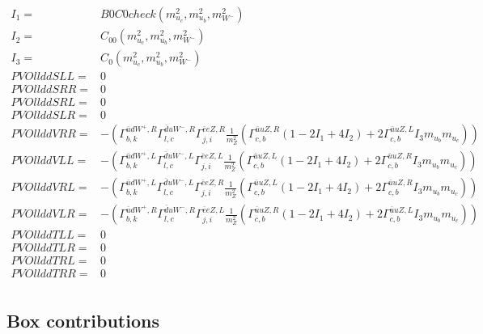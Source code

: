 \documentclass[A4,landscape]{article}
\begin{document}
\begin{align} 
I_1= & B0C0check(m^2_{u_{{c}}}, m^2_{u_{{b}}}, m^2_{W^-}) \\ 
I_2= & C_{00}(m^2_{u_{{c}}}, m^2_{u_{{b}}}, m^2_{W^-}) \\ 
I_3= & C_0(m^2_{u_{{c}}}, m^2_{u_{{b}}}, m^2_{W^-}) \\ 
  PVOllddSLL= & 0 \\ 
  PVOllddSRR= & 0 \\ 
  PVOllddSRL= & 0 \\ 
  PVOllddSLR= & 0 \\ 
  PVOllddVRR= & -( \Gamma^{\bar{u}d W^+,R}_{b, k} \Gamma^{\bar{d}u W^- ,R}_{l, c} \Gamma^{\bar{e}e Z ,R}_{j, i} \frac{1}{m^2_{Z}} (\Gamma^{\bar{u}u Z ,R}_{c, b} (1 - 2 I_1 + 4 I_2) + 2 \Gamma^{\bar{u}u Z ,L}_{c, b} I_3 m_{u_{{b}}} m_{u_{{c}}})) \\ 
  PVOllddVLL= & -( \Gamma^{\bar{u}d W^+,L}_{b, k} \Gamma^{\bar{d}u W^- ,L}_{l, c} \Gamma^{\bar{e}e Z ,L}_{j, i} \frac{1}{m^2_{Z}} (\Gamma^{\bar{u}u Z ,L}_{c, b} (1 - 2 I_1 + 4 I_2) + 2 \Gamma^{\bar{u}u Z ,R}_{c, b} I_3 m_{u_{{b}}} m_{u_{{c}}})) \\ 
  PVOllddVRL= & -( \Gamma^{\bar{u}d W^+,L}_{b, k} \Gamma^{\bar{d}u W^- ,L}_{l, c} \Gamma^{\bar{e}e Z ,R}_{j, i} \frac{1}{m^2_{Z}} (\Gamma^{\bar{u}u Z ,L}_{c, b} (1 - 2 I_1 + 4 I_2) + 2 \Gamma^{\bar{u}u Z ,R}_{c, b} I_3 m_{u_{{b}}} m_{u_{{c}}})) \\ 
  PVOllddVLR= & -( \Gamma^{\bar{u}d W^+,R}_{b, k} \Gamma^{\bar{d}u W^- ,R}_{l, c} \Gamma^{\bar{e}e Z ,L}_{j, i} \frac{1}{m^2_{Z}} (\Gamma^{\bar{u}u Z ,R}_{c, b} (1 - 2 I_1 + 4 I_2) + 2 \Gamma^{\bar{u}u Z ,L}_{c, b} I_3 m_{u_{{b}}} m_{u_{{c}}})) \\ 
  PVOllddTLL= & 0 \\ 
  PVOllddTLR= & 0 \\ 
  PVOllddTRL= & 0 \\ 
  PVOllddTRR= & 0 \\ 
\end{align} 
\subsection{Box contributions} 
\end{document}
